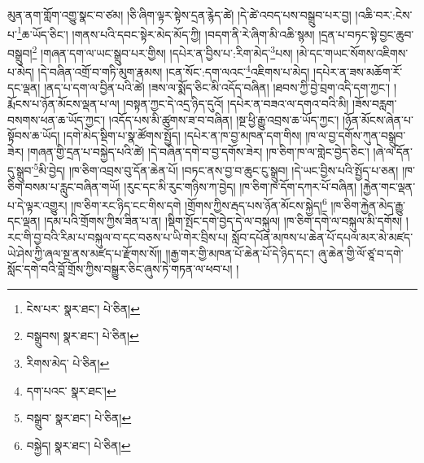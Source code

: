 མུན་ནག་གློག་འགྱུ་སྣང་བ་ཙམ། །ཅི་ཞིག་ལྟར་སྟེས་དྲན་རྙེད་ཚེ། །དེ་ཚེ་འབད་པས་བསྒྲུབ་པར་བྱ། །འཆི་བར་:ངེས་པ་\footnote{ངེས་པར་  སྣར་ཐང་།  པེ་ཅིན། }ཆ་ཡོད་ཅིང་། །གནས་པའི་དབང་སྟེར་མེད་མོད་ཀྱི། །བདག་ནི་རེ་ཞིག་མི་འཆི་སྙམ། །དྲན་པ་བཏང་སྟེ་བྱང་ཆུབ་བསྒྲུབ།\footnote{བསྒྲུབས།  སྣར་ཐང་།  པེ་ཅིན། } །གཞན་དག་ལ་ཡང་སྒྲུབ་པར་གྱིས། །དཔེར་ན་བྱིས་པ་:རིག་མེད་\footnote{རིགས་མེད་  པེ་ཅིན། }པས། །མེ་དང་གཡང་སོགས་འཇིགས་པ་མེད། །དེ་བཞིན་འགྲོ་བ་གཏི་མུག་རྣམས། །ངན་སོང་:དག་ལའང་\footnote{དག་པའང་  སྣར་ཐང་། }འཇིགས་པ་མེད། །དཔེར་ན་ཟས་མཆོག་རོ་དང་ལྡན། །ནད་པ་དག་ལ་བྱིན་པའི་ཚེ། །ཟས་ལ་སྨོད་ཅིང་མི་འདོད་བཞིན། །ཐབས་ཀྱི་བྱེ་བྲག་འདི་དག་ཀྱང་། །རྨོངས་པ་ཉོན་མོངས་ལྡན་པ་ལ། །བསྟན་ཀྱང་དེ་འདྲ་ཉིད་དུའོ། །དཔེར་ན་བཟའ་ལ་དགའ་བའི་མི། །ཟོས་བརླག་བསགས་ཕན་ཆ་ཡོད་ཀྱང་། །འདོད་པས་མི་ཚུགས་ཟ་བ་བཞིན། །སྔ་ཕྱི་རྒྱུ་འབྲས་ཆ་ཡོད་ཀྱང་། །ཉོན་མོངས་ཞེན་པ་སྟོབས་ཆ་ཡོད། །དགེ་མེད་སྡིག་པ་སྣ་ཚོགས་སྤྱོད། །དཔེར་ན་ཁ་བྱ་མཁན་དག་གིས། །ཁ་ལ་བྱ་དགོས་ཀུན་བསྒྲུབ་ཟེར། །གཞན་གྱི་དྲན་པ་བསྐྱེད་པའི་ཚེ། །དེ་བཞིན་དགེ་བ་བྱ་དགོས་ཟེར། །ཁ་ཅིག་ཁ་ལ་གླེང་བྱེད་ཅིང་། །ཞེ་ལ་དོན་དུ་སྒྲུབ་\footnote{བསྒྲུབ་  སྣར་ཐང་།  པེ་ཅིན། }མི་བྱེད། །ཁ་ཅིག་འབྲས་བུ་དོན་ཆེན་པོ། །བཏང་ནས་བྱ་བ་ཆུང་ངུ་སྒྲུབ། །དེ་ཡང་བྱིས་པའི་སྤྱོད་པ་ཅན། །ཁ་ཅིག་བསམ་པ་རླུང་བཞིན་གཡོ། །རུང་དང་མི་རུང་གཉིས་ཀ་བྱེད། །ཁ་ཅིག་ཁ་དོག་དཀར་པོ་བཞིན། །རྐྱེན་གང་ལྡན་པ་དེ་ལྟར་འགྱུར། །ཁ་ཅིག་རང་ཉིད་ངང་གིས་དགེ །གྲོགས་ཀྱིས་རྦད་པས་ཉོན་མོངས་སྐྱེད།\footnote{བསྐྱེད།  སྣར་ཐང་།  པེ་ཅིན། } །ཁ་ཅིག་རྐྱེན་མེད་རྒྱུ་དང་ལྡན། །དམ་པའི་གྲོགས་ཀྱིས་ཟིན་པ་ན། །སྡིག་སྤོང་དགེ་བྱེད་དེ་ལ་བསྐུལ། །ཁ་ཅིག་དགེ་ལ་བསྐུལ་མི་དགོས། །རང་གི་བྱ་བའི་རིམ་པ་བསྐུལ་བ་དང་བཅས་པ་ཡི་གེར་བྲིས་པ། སློབ་དཔོན་མཁས་པ་ཆེན་པོ་དཔལ་མར་མེ་མཛད་ཡེ་ཤེས་ཀྱི་ཞལ་སྔ་ནས་མཛད་པ་རྫོགས་སོ།། །།རྒྱ་གར་གྱི་མཁན་པོ་ཆེན་པོ་དེ་ཉིད་དང་། ཞུ་ཆེན་གྱི་ལོ་ཙཱ་བ་དགེ་སློང་དགེ་བའི་བློ་གྲོས་ཀྱིས་བསྒྱུར་ཅིང་ཞུས་ཏེ་གཏན་ལ་ཕབ་པ། ། 